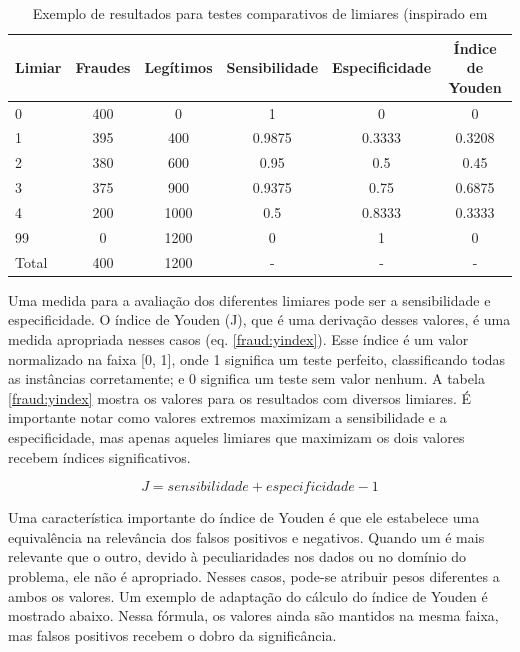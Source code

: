\vspace{2mm}
\begin{table}[h!]
    \centering
    \begin{tabular}{l c c c c c}
        \hline
        Limiar & Fraudes & Legítimos & Sensibilidade & Especificidade & Índice de Youden \\
        \hline
        0     & 400 &    0 & 1      & 0      & 0      \\
        1     & 395 &  400 & 0.9875 & 0.3333 & 0.3208  \\
        2     & 380 &  600 & 0.95   & 0.5    & 0.45   \\
        3     & 375 &  900 & 0.9375 & 0.75   & 0.6875 \\
        4     & 200 & 1000 & 0.5    & 0.8333 & 0.3333 \\
        99    &   0 & 1200 & 0      & 1      & 0      \\
        \hline
        Total & 400 & 1200 &    -   &    -   &    -   \\
        \hline
    \end{tabular}
    \caption{Exemplo de resultados para testes comparativos de limiares (inspirado em \citet{Bewick2004}}
    \label{fraud:youden}
\end{table}
\vspace{2mm}

Uma medida para a avaliação dos diferentes limiares pode ser a sensibilidade e especificidade. O índice de Youden (J), que é uma derivação desses valores, é uma medida apropriada nesses casos (eq. \ref{fraud:yindex}). Esse índice é um valor normalizado na faixa [0, 1], onde 1 significa um teste perfeito, classificando todas as instâncias corretamente; e 0 significa um teste sem valor nenhum. A tabela \ref{fraud:yindex} mostra os valores para os resultados com diversos limiares. É importante notar como valores extremos maximizam a sensibilidade e a especificidade, mas apenas aqueles limiares que maximizam os dois valores recebem índices significativos.

\vspace{2mm}
\begin{equation}
    J = sensibilidade + especificidade - 1
    \label{fraud:yindex}
\end{equation}
\vspace{2mm}

Uma característica importante do índice de Youden é que ele estabelece uma equivalência na relevância dos falsos positivos e negativos. Quando um é mais relevante que o outro, devido à peculiaridades nos dados ou no domínio do problema, ele não é apropriado. Nesses casos, pode-se atribuir pesos diferentes a ambos os valores. Um exemplo de adaptação do cálculo do índice de Youden é mostrado abaixo. Nessa fórmula, os valores ainda são mantidos na mesma faixa, mas falsos positivos recebem o dobro da significância.

